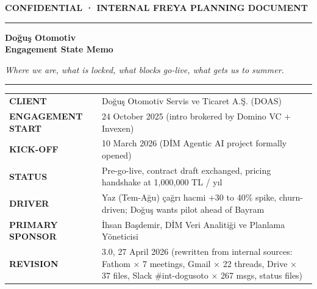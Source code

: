 \documentclass[10pt,a4paper]{article}
\begin{document}
\thispagestyle{empty}

\vspace*{1.5em}
{\fontsize{12}{14}\selectfont\sffamily\color{Light}\textbf{CONFIDENTIAL · INTERNAL FREYA PLANNING DOCUMENT}\par}
\vspace{0.6em}
{\color{NavyDark}\rule{\linewidth}{1.2pt}}
\vspace{3em}

{\fontsize{42}{48}\selectfont\bfseries\color{Ink}\sffamily Doğuş Otomotiv \\[0.15em] Engagement State Memo\par}
\vspace{0.6em}
{\fontsize{20}{24}\selectfont\itshape\color{NavyDark} Where we are, what is locked, what blocks go-live, what gets us to summer.\par}

\vspace{4em}

{\color{NavyDark}\rule{\linewidth}{0.4pt}}
\vspace{1em}

\begin{tabularx}{\linewidth}{@{}lX@{}}
\textbf{\color{Light}\footnotesize CLIENT}              & \color{Ink} Doğuş Otomotiv Servis ve Ticaret A.Ş. (DOAS)\\[0.4em]
\textbf{\color{Light}\footnotesize ENGAGEMENT START}    & \color{Ink} 24 October 2025 (intro brokered by Domino VC + Invexen)\\[0.4em]
\textbf{\color{Light}\footnotesize KICK-OFF}            & \color{Ink} 10 March 2026 (DİM Agentic AI project formally opened)\\[0.4em]
\textbf{\color{Light}\footnotesize STATUS}              & \color{Ink} Pre-go-live, contract draft exchanged, pricing handshake at 1{,}000{,}000 TL / yıl\\[0.4em]
\textbf{\color{Light}\footnotesize DRIVER}              & \color{Ink} Yaz (Tem-Ağu) çağrı hacmi +30 to 40\% spike, churn-driven; Doğuş wants pilot ahead of Bayram\\[0.4em]
\textbf{\color{Light}\footnotesize PRIMARY SPONSOR}     & \color{Ink} İhsan Başdemir, DİM Veri Analitiği ve Planlama Yöneticisi\\[0.4em]
\textbf{\color{Light}\footnotesize REVISION}            & \color{Ink} 3.0, 27 April 2026 (rewritten from internal sources: Fathom × 7 meetings, Gmail × 22 threads, Drive × 37 files, Slack \#int-dogusoto × 267 msgs, status files)\\
\end{tabularx}
\end{document}
